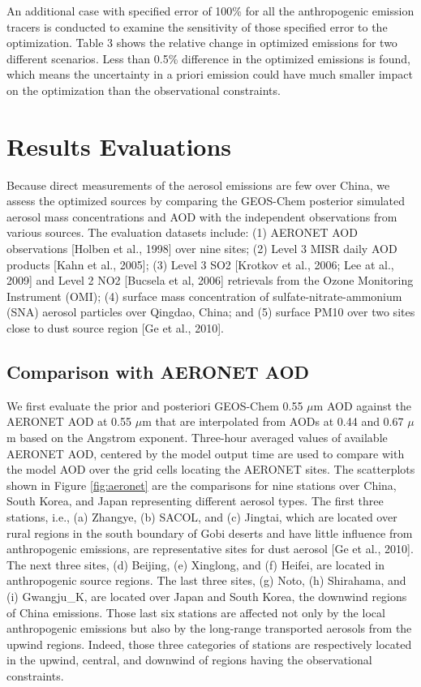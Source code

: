  An additional case with specified error of 100\% for all the anthropogenic emission tracers
 is conducted to examine the sensitivity of those specified error to the optimization.
 Table 3 shows the relative change in optimized emissions for two different scenarios.
 Less than 0.5\% difference in the optimized emissions is found,
 which means the uncertainty in a priori emission could have
 much smaller impact on the optimization than the observational constraints.

\section{Results Evaluations} 

 Because direct measurements of the aerosol emissions are few over China,
 we assess the optimized sources by comparing the GEOS-Chem posterior
 simulated aerosol mass concentrations and AOD with
 the independent observations from various sources.
 The evaluation datasets include:
 (1) AERONET AOD observations [Holben et al., 1998] over nine sites;
 (2) Level 3 MISR daily AOD products [Kahn et al., 2005];
 (3) Level 3 SO2 [Krotkov et al., 2006; Lee at al., 2009]
 and Level 2 NO2 [Bucsela et al, 2006] retrievals from the Ozone Monitoring Instrument (OMI);
 (4) surface mass concentration of sulfate-nitrate-ammonium (SNA) aerosol particles over Qingdao, China;
 and (5) surface PM10 over two sites close to dust source region [Ge et al., 2010]. 

 \subsection{Comparison with AERONET AOD}

 We first evaluate the prior and posteriori GEOS-Chem 0.55 $\mu$m AOD against
 the AERONET AOD at 0.55 $\mu$m that are interpolated from AODs at 0.44 and 0.67 $\mu$m
 based on the Angstrom exponent.
 Three-hour averaged values of available AERONET AOD,
 centered by the model output time are used to compare with
 the model AOD over the grid cells locating the AERONET sites.
 The scatterplots shown in Figure \ref{fig:aeronet} are the comparisons
 for nine stations over China, South Korea, and Japan representing different aerosol types.
 The first three stations, i.e., (a) Zhangye, (b) SACOL, and (c) Jingtai,
 which are located over rural regions in the south boundary of Gobi deserts
 and have little influence from anthropogenic emissions,
 are representative sites for dust aerosol [Ge et al., 2010].
 The next three sites, (d) Beijing, (e) Xinglong, and (f) Heifei,
 are located in anthropogenic source regions.
 The last three sites, (g) Noto, (h) Shirahama, and (i) Gwangju\_K,
 are located over Japan and South Korea, the downwind regions of China emissions.
 Those last six stations are affected not only by the local anthropogenic emissions
 but also by the long-range transported aerosols from the upwind regions.
 Indeed, those three categories of stations are respectively located
 in the upwind, central, and downwind of regions having the observational constraints.

